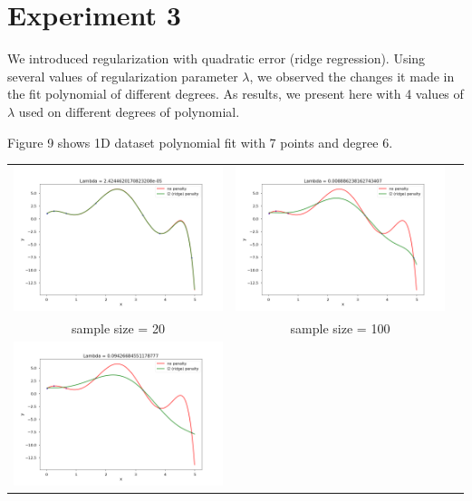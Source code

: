 \documentclass[11pt]{article}
\begin{document}
\section*{Experiment 3}

We introduced regularization with quadratic error (ridge regression). Using several values of regularization parameter \(\lambda\), we observed the changes it made in the fit polynomial of different degrees. As results, we present here with 4 values of \(\lambda\) used on different degrees of polynomial.

Figure 9 shows 1D dataset polynomial fit with 7 points and degree 6.

\begin{center}
  \setlength\tabcolsep{0pt}
  \begin{tabular}{ccc}
  \includegraphics[width=7cm]{regression/1d-ridge-ls-compare-7-7lnlam--4.615384615384617-fig.png}
  & \includegraphics[width=7cm]{regression/1d-ridge-ls-compare-7-7lnlam--2.051282051282051-fig.png}\\
  sample size = 20 & sample size = 100\\
  \includegraphics[width=7cm]{regression/1d-ridge-ls-compare-7-7lnlam--1.025641025641029-fig.png}

\end{tabular}
\end{center}
\end{document}
